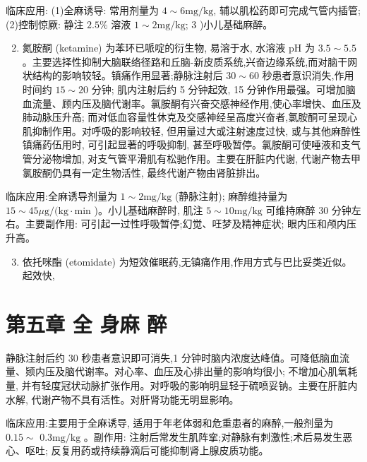 \documentclass[10pt]{article}
\begin{document}
临床应用: (1)全麻诱导: 常用剂量为 $4 \sim 6 \mathrm{mg} / \mathrm{kg}$, 辅以肌松药即可完成气管内插管; (2)控制惊厥: 静注 $2.5 \%$ 溶液 $1 \sim 2 \mathrm{mg} / \mathrm{kg}$; 3 )小儿基础麻醉。

\begin{enumerate}
  \setcounter{enumi}{1}
  \item 氮胺酮 (ketamine) 为苯环已哌啶的衍生物, 易溶于水, 水溶液 $\mathrm{pH}$ 为 $3.5 \sim 5.5$ 。主要选择性抑制大脑联络径路和丘脑-新皮质系统,兴奋边缘系统,而对脑干网状结构的影响较轻。镇痛作用显著;静脉注射后 $30 \sim 60$ 秒患者意识消失,作用时间约 $15 \sim 20$ 分钟; 肌内注射后约 5 分钟起效, 15 分钟作用最强。可增加脑血流量、顾内压及脑代谢率。氯胺酮有兴奋交感神经作用,使心率增快、血压及肺动脉压升高; 而对低血容量性休克及交感神经呈高度兴奋者,氯胺酮可呈现心肌抑制作用。对呼吸的影响较轻, 但用量过大或注射速度过快, 或与其他麻醉性镇痛药伍用时, 可引起显著的呼吸抑制, 甚至呼吸暂停。氯胺酮可使唾液和支气管分泌物增加, 对支气管平滑肌有松驰作用。主要在肝脏内代谢, 代谢产物去甲氯胺酮仍具有一定生物活性, 最终代谢产物由肾脏排出。
\end{enumerate}

临床应用:全麻诱导剂量为 $1 \sim 2 \mathrm{mg} / \mathrm{kg}$ (静脉注射); 麻醉维持量为 $15 \sim 45 \mu \mathrm{g} /(\mathrm{kg} \cdot \mathrm{min}$ )。小儿基础麻醉时, 肌注 $5 \sim 10 \mathrm{mg} / \mathrm{kg}$ 可维持麻醉 30 分钟左右。主要副作用: 可引起一过性呼吸暂停;幻觉、㕵梦及精神症状; 眼内压和颅内压升高。

\begin{enumerate}
  \setcounter{enumi}{2}
  \item 依托咪酯 (etomidate) 为短效催眠药,无镇痛作用,作用方式与巴比妥类近似。起效快,
\end{enumerate}

\section*{第五章 全 身麻 醉}
静脉注射后约 30 秒患者意识即可消失,1 分钟时脑内浓度达峰值。可降低脑血流量、颎内压及脑代谢率。对心率、血压及心排出量的影响均很小; 不增加心肌氧耗量, 并有轻度冠状动脉扩张作用。对呼吸的影响明显轻于硫喷妥钠。主要在肝脏内水解, 代谢产物不具有活性。对肝肾功能无明显影响。

临床应用:主要用于全麻诱导, 适用于年老体弱和危重患者的麻醉,一般剂量为 $0.15 \sim$ $0.3 \mathrm{mg} / \mathrm{kg}$ 。副作用: 注射后常发生肌阵挛;对静脉有刺激性;术后易发生恶心、呕吐; 反复用药或持续静滴后可能抑制肾上腺皮质功能。
\end{document}
